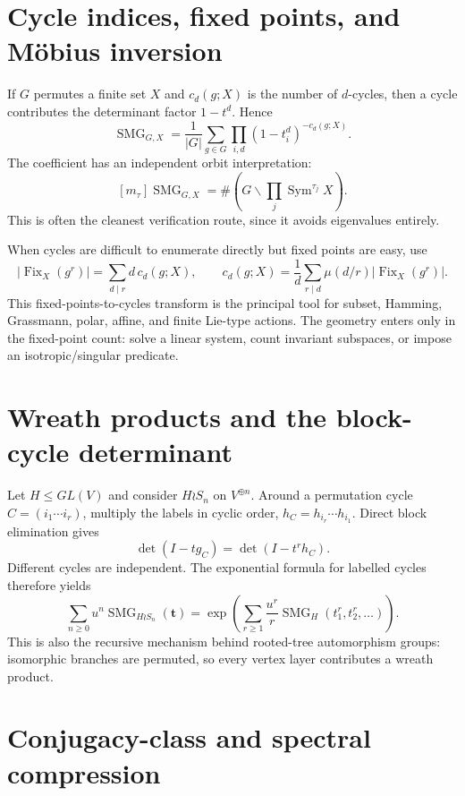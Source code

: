 \documentclass[10pt]{article}
\newcommand{\Sym}{\operatorname{Sym}}
\newcommand{\Fix}{\operatorname{Fix}}
\newcommand{\SMG}{\operatorname{SMG}}
\newcommand{\MGF}{\SMG}
\begin{document}
\section{Cycle indices, fixed points, and M\"obius inversion}

If $G$ permutes a finite set $X$ and $c_d(g;X)$ is the number of $d$-cycles,
then a cycle contributes the determinant factor $1-t^d$.  Hence
\begin{equation}\label{eq:tool-permutation}
\boxed{\MGF_{G,X}=\frac1{|G|}\sum_{g\in G}
\prod_{i,d}(1-t_i^d)^{-c_d(g;X)}.}
\end{equation}
The coefficient has an independent orbit interpretation:
\[
[m_\tau]\MGF_{G,X}
=\#\left(G\backslash\prod_j\Sym^{\tau_j}X\right).
\]
This is often the cleanest verification route, since it avoids eigenvalues
entirely.

When cycles are difficult to enumerate directly but fixed points are easy,
use
\[
|\Fix_X(g^r)|=\sum_{d\mid r}d\,c_d(g;X),
\qquad
c_d(g;X)=\frac1d\sum_{r\mid d}\mu(d/r)|\Fix_X(g^r)|.
\]
This fixed-points-to-cycles transform is the principal tool for subset,
Hamming, Grassmann, polar, affine, and finite Lie-type actions.  The geometry
enters only in the fixed-point count: solve a linear system, count invariant
subspaces, or impose an isotropic/singular predicate.

\section{Wreath products and the block-cycle determinant}

Let $H\le GL(V)$ and consider $H\wr S_n$ on $V^{\oplus n}$.  Around a
permutation cycle $C=(i_1\cdots i_r)$, multiply the labels in cyclic order,
$h_C=h_{i_r}\cdots h_{i_1}$.  Direct block elimination gives
\[
\det(I-tg_C)=\det(I-t^rh_C).
\]
Different cycles are independent.  The exponential formula for labelled
cycles therefore yields
\begin{equation}\label{eq:tool-wreath}
\boxed{\sum_{n\ge0}u^n\MGF_{H\wr S_n}(\mathbf t)
=\exp\!\left(\sum_{r\ge1}\frac{u^r}{r}
\MGF_H(t_1^r,t_2^r,\ldots)\right).}
\end{equation}
This is also the recursive mechanism behind rooted-tree automorphism groups:
isomorphic branches are permuted, so every vertex layer contributes a wreath
product.

\section{Conjugacy-class and spectral compression}
\end{document}
